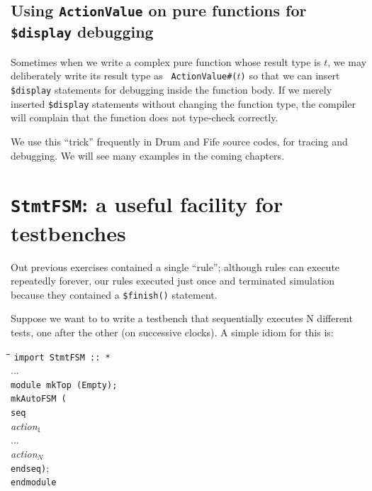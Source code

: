 
\subsection{Using {\tt ActionValue} on pure functions for {\tt \$display} debugging}

Sometimes when we write a complex pure function whose result type is
$t$, we may deliberately write its result type as {\tt
ActionValue\#($t$)} so that we can insert \verb|$display| statements
for debugging inside the function body.  If we merely inserted
\verb|$display| statements without changing the function type, the
compiler will complain that the function does not type-check
correctly.

We use this ``trick'' frequently in Drum and Fife source codes, for
tracing and debugging.  We will see many examples in the coming
chapters.


\section{{\tt StmtFSM}: a useful facility for testbenches}

\label{BSV_small_testbench}


Out previous exercises contained a single ``rule''; although rules can
execute repeatedly forever, our rules executed just once and
terminated simulation because they contained a \verb|$finish()|
statement.

Suppose we want to to write a testbench that sequentially executes N
different tests, one after the other (on successive clocks).  A simple
idiom for this is:

{\footnotesize
\begin{tabbing}
\hmmm \= \hm \= \hm \= \hm \= \kill
      \> {\tt import StmtFSM :: *} \\
      \> ... \\
      \> {\tt module mkTop (Empty);} \\
      \>     \> {\tt mkAutoFSM (} \\
      \>     \>     \> {\tt seq} \\
      \>     \>     \>     \> \emph{action$_1$} \\
      \>     \>     \>     \> ... \\
      \>     \>     \>     \> \emph{action$_N$} \\
      \>     \>     \> {\tt endseq)}; \\
      \> {\tt endmodule}
\end{tabbing}}


